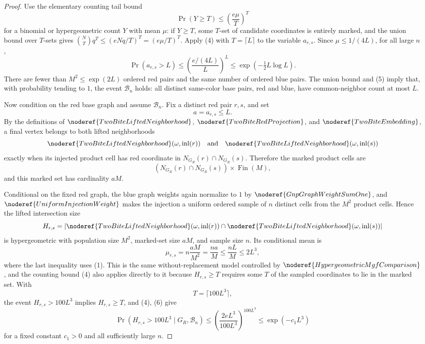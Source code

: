 \begin{proof}
Use the elementary counting tail bound
\[
\Pr(Y\ge T)\le \left(\frac{e\mu}{T}\right)^T
\tag{4}
\]
for a binomial or hypergeometric count \(Y\) with mean \(\mu\): if \(Y\ge T\),
some \(T\)-set of candidate coordinates is entirely marked, and the union
bound over \(T\)-sets gives
\(\binom{N}{T}q^T\le(eNq/T)^T=(e\mu/T)^T\).  Apply (4) with
\(T=\lceil L\rceil\) to the variable \(a_{r,s}\).  Since
\(\mu\le1/(4L)\), for all large \(n\),
\[
\Pr(a_{r,s}>L)\le
\left(\frac{e/(4L)}{L}\right)^L
\le \exp(-{\tfrac12}L\log L).
\tag{5}
\]
There are fewer than \(M^2\le\exp(2L)\) ordered red pairs and the same number
of ordered blue pairs.  The union bound and (5) imply that, with probability
tending to \(1\), the event \(\mathcal B_n\) holds: all distinct same-color
base pairs, red and blue, have common-neighbor count at most \(L\).

Now condition on the red base graph and assume \(\mathcal B_n\).  Fix a
distinct red pair \(r,s\), and set
\[
a=a_{r,s}\le L.
\]
By the definitions of \(\noderef{TwoBiteLiftedNeighborhood}\),
\(\noderef{TwoBiteRedProjection}\), and \(\noderef{TwoBiteEmbedding}\), a
final vertex belongs to both lifted neighborhoods
\[
\noderef{TwoBiteLiftedNeighborhood}(\omega,\operatorname{inl}(r))
\quad\text{and}\quad
\noderef{TwoBiteLiftedNeighborhood}(\omega,\operatorname{inl}(s))
\]
exactly when its injected product cell has red coordinate in
\(N_{G_R}(r)\cap N_{G_R}(s)\).  Therefore the marked product cells are
\[
(N_{G_R}(r)\cap N_{G_R}(s))\times\operatorname{Fin}(M),
\]
and this marked set has cardinality \(aM\).

Conditional on the fixed red graph, the blue graph weights again normalize
to \(1\) by \(\noderef{GnpGraphWeightSumOne}\), and
\(\noderef{UniformInjectionWeight}\) makes the injection a uniform ordered
sample of \(n\) distinct cells from the \(M^2\) product cells.  Hence the
lifted intersection size
\[
H_{r,s}=
\left|
\noderef{TwoBiteLiftedNeighborhood}(\omega,\operatorname{inl}(r))
\cap
\noderef{TwoBiteLiftedNeighborhood}(\omega,\operatorname{inl}(s))
\right|
\]
is hypergeometric with population size \(M^2\), marked-set size \(aM\), and
sample size \(n\).  Its conditional mean is
\[
\mu_{r,s}=n\frac{aM}{M^2}=\frac{na}{M}
\le \frac{nL}{M}\le 2L^3,
\tag{6}
\]
where the last inequality uses (1).  This is the same without-replacement
model controlled by \(\noderef{HypergeometricMgfComparison}\), and the
counting bound (4) also applies directly to it because \(H_{r,s}\ge T\)
requires some \(T\) of the sampled coordinates to lie in the marked set.
With
\[
T=\lceil 100L^3\rceil,
\]
the event \(H_{r,s}>100L^3\) implies \(H_{r,s}\ge T\), and (4), (6) give
\[
\Pr(H_{r,s}>100L^3\mid G_R,\mathcal B_n)
\le \left(\frac{2eL^3}{100L^3}\right)^{100L^3}
\le \exp(-c_1L^3)
\tag{7}
\]
for a fixed constant \(c_1>0\) and all sufficiently large \(n\).


\end{proof}
